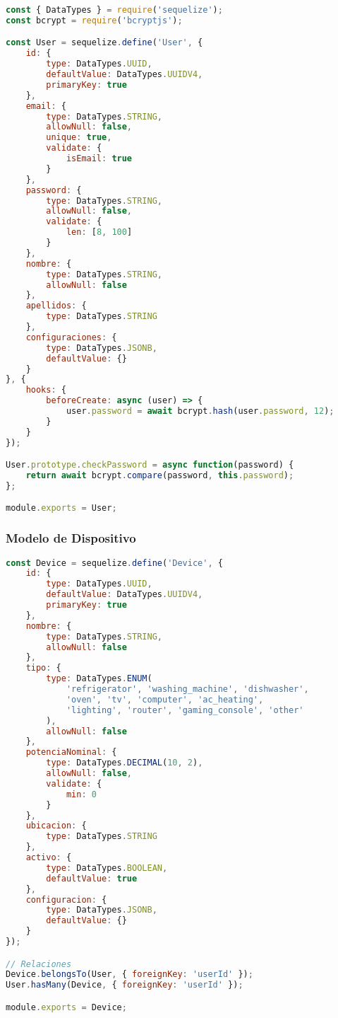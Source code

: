 \begin{lstlisting}[language=JavaScript, caption=Modelo de Usuario]
const { DataTypes } = require('sequelize');
const bcrypt = require('bcryptjs');

const User = sequelize.define('User', {
    id: {
        type: DataTypes.UUID,
        defaultValue: DataTypes.UUIDV4,
        primaryKey: true
    },
    email: {
        type: DataTypes.STRING,
        allowNull: false,
        unique: true,
        validate: {
            isEmail: true
        }
    },
    password: {
        type: DataTypes.STRING,
        allowNull: false,
        validate: {
            len: [8, 100]
        }
    },
    nombre: {
        type: DataTypes.STRING,
        allowNull: false
    },
    apellidos: {
        type: DataTypes.STRING
    },
    configuraciones: {
        type: DataTypes.JSONB,
        defaultValue: {}
    }
}, {
    hooks: {
        beforeCreate: async (user) => {
            user.password = await bcrypt.hash(user.password, 12);
        }
    }
});

User.prototype.checkPassword = async function(password) {
    return await bcrypt.compare(password, this.password);
};

module.exports = User;
\end{lstlisting}

\subsubsection{Modelo de Dispositivo}

\begin{lstlisting}[language=JavaScript, caption=Modelo de Dispositivo]
const Device = sequelize.define('Device', {
    id: {
        type: DataTypes.UUID,
        defaultValue: DataTypes.UUIDV4,
        primaryKey: true
    },
    nombre: {
        type: DataTypes.STRING,
        allowNull: false
    },
    tipo: {
        type: DataTypes.ENUM(
            'refrigerator', 'washing_machine', 'dishwasher',
            'oven', 'tv', 'computer', 'ac_heating',
            'lighting', 'router', 'gaming_console', 'other'
        ),
        allowNull: false
    },
    potenciaNominal: {
        type: DataTypes.DECIMAL(10, 2),
        allowNull: false,
        validate: {
            min: 0
        }
    },
    ubicacion: {
        type: DataTypes.STRING
    },
    activo: {
        type: DataTypes.BOOLEAN,
        defaultValue: true
    },
    configuracion: {
        type: DataTypes.JSONB,
        defaultValue: {}
    }
});

// Relaciones
Device.belongsTo(User, { foreignKey: 'userId' });
User.hasMany(Device, { foreignKey: 'userId' });

module.exports = Device;
\end{lstlisting}

